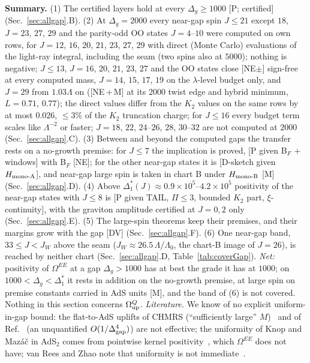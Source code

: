 \documentclass[aps,prl,onecolumn,superscriptaddress,nofootinbib]{revtex4-2}
\begin{document}
\textbf{Summary.} (1) The certified layers hold at every $\Delta_g\ge1000$ [P; certified] (Sec.~\ref{sec:allgap}.B).
(2) At $\Delta_g=2000$ every near-gap spin $J\le21$ except $18$, $J=23$, $27$, $29$ and the parity-odd OO states $J=4$--$10$
were computed on own rows, for $J=12$, $16$, $20$, $21$, $23$, $27$, $29$ with direct (Monte Carlo) evaluations of the light-ray
integral, including the seam (two spins also at $5000$); nothing is negative; $J\le13$, $J=16$, $20$, $21$, $23$, $27$ and the OO
states close [NE$\pm$] sign-free at every computed mass, $J=14$, $15$, $17$, $19$ on the $\lambda$-level budget only, and $J=29$ from
$1.03\Lambda$ on ([NE\,+\,M] at its $2000$ twist edge and hybrid minimum, $L=0.71$, $0.77$); the direct values differ from the $K_2$ values on the
same rows by at most $0.026$, $\le3\%$ of the $K_2$ truncation charge; for $J\le16$ every budget term scales like $\Lambda^{-2}$ or
faster; $J=18$, $22$, $24$--$26$, $28$, $30$--$32$ are not computed at $2000$ (Sec.~\ref{sec:allgap}.C).
(3) Between and beyond the computed gaps the
transfer rests on a no-growth premise: for $J\le7$ the implication is proved, [P given B$_F$ + windows] with B$_F$ [NE]; for the other
near-gap states it is [D-sketch given $H_{\rm mono\text{-}A}$], and near-gap large spin is taken in chart B under $H_{\rm mono\text{-}B}$ [M]
(Sec.~\ref{sec:allgap}.D). (4) Above $\Delta_1^*(J)\approx0.9\times10^5$--$4.2\times10^5$ positivity of the near-gap states with
$J\le8$ is [P given TAIL, $\Pi\le3$, bounded $K_2$ part, $\xi$-continuity], with the graviton amplitude certified at $J=0,2$ only
(Sec.~\ref{sec:allgap}.E). (5) The large-spin theorems keep their premises, and their margins grow with the gap [DV]
(Sec.~\ref{sec:allgap}.F). (6) One near-gap band, $33\le J<J_W$ above the seam ($J_W\approx26.5\,\Lambda/\Lambda_0$, the chart-B image of $J=26$), is reached by neither
chart (Sec.~\ref{sec:allgap}.D, Table~\ref{tab:coverGap}). \emph{Net:} positivity of $\Omega^{EE}$ at a gap $\Delta_g>1000$ has at best
the grade it has at $1000$; on $1000<\Delta_g<\Delta_1^*$ it rests in addition on the no-growth premise, at large spin on premise
constants carried in AdS units [M], and the band of (6) is not covered.  Nothing
in this section concerns $\Omega^Q_{\rm up}$. \emph{Literature.} We know of no explicit uniform-in-gap bound: the flat-to-AdS uplifts
of CHMRS (``sufficiently large'' $M$)~\cite{CHMRS} and of Ref.~\cite{CHLPSpw} (an unquantified $O(1/\Delta_{\rm gap}^4)$) are not
effective; the uniformity of Knop and Maz\'a\v{c} in AdS$_2$ comes from pointwise kernel positivity~\cite{KnopMazac}, which
$\Omega^{EE}$ does not have; van Rees and Zhao note that uniformity is not immediate~\cite{vanReesZhao}.
\end{document}
